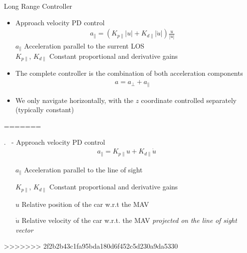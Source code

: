 \begin{frame}{Long Range Controller}
	\begin{itemize}
	\item	Approach velocity PD control
	\begin{align*}
		a_\parallel = \left( K_{p\parallel} |u| + K_{d\parallel} |\dot{u}| \right) \frac{u}{|u|} 
	\end{align*}
	$a_\parallel$ Acceleration parallel to the surrent LOS  \\ %
	$K_{p\parallel}$, $K_{d\parallel}$ Constant proportional and derivative gains
	
	\item The complete controller is the combination of both acceleration components
	\begin{align*}
		a = a_\perp + a_\parallel
	\end{align*}
	\item We only navigate horizontally, with the $z$ coordinate controlled separately (typically constant)
	\end{itemize}
=======
\begin{frame}{\thesection. \insertsection \ - \insertsubsection}
	Approach velocity PD control
	\begin{align}
		a_\parallel = K_{p\parallel} u + K_{d\parallel} \dot{u} 
	\end{align}
	\begin{enumerate}
		\item[$a_\parallel$] Acceleration parallel to the line of sight
		\item[$K_{p\parallel}$, $K_{d\parallel}$] Constant proportional and derivative gains
		\item[$u$] Relative position of the car w.r.t the MAV
		\item[$\dot{u}$] Relative velocity of the car w.r.t. the MAV \textit{projected on the line of sight vector}
	\end{enumerate}
>>>>>>> 2f2b2b43c1fa95bda180d6f452c5d230a9da5330
\end{frame}



\end{frame}
